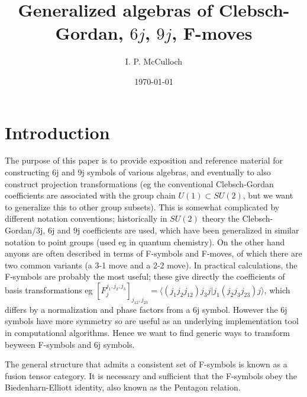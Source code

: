\documentclass[12pt]{article}
\newcommand{\fsymbol}[6]{\mbox{$\left[ F^{#1,#2,#3}_{#4} \right]_{#5,#6}$}}
\begin{document}
\title{Generalized algebras of Clebsch-Gordan, $6j$, $9j$, F-moves}

\author{I. P. McCulloch}
\date{\today}

\maketitle

\section{Introduction}

The purpose of this paper is to provide exposition and reference material for constructing
6j and 9j symbols of various algebras, and eventually to also construct projection
transformations (eg the conventional Clebsch-Gordan coefficients are associated with the
group chain $U(1) \subset SU(2)$, but we want to generalize this to other group subsets). 
This is somewhat complicated by different notation conventions; historically in $SU(2)$ theory
the Clebsch-Gordan/3j, 6j and 9j coefficients are used, which have been generalized
in similar notation to point groups (used eg in quantum chemistry). On the other hand
anyons are often described in terms of F-symbols and F-moves, of which there are two
common variants (a 3-1 move and a 2-2 move). In practical calculations, the F-symbols are
probably the most useful; these give directly the coefficients of basis transformations eg
$\fsymbol{j_1}{j_2}{j_3}{j}{j_{12}}{j_{23}} 
= \langle (j_1 j_2 j_{12}) j_3 j \vert j_1 (j_2 j_3 j_{23}) j \rangle$, 
which differs by a normalization and phase factors from a 6j symbol. However the 6j symbols
have more symmetry so are useful as an underlying implementation tool in computational
algorithms. Hence we want to find generic ways to transform beyween F-symbols and 6j symbols.

The general structure that admits a consistent set of F-symbols is known as a fusion tensor category.
It is necessary and sufficient that the F-symbols obey the Biedenharn-Elliott identity, also
known as the Pentagon relation.
\end{document}
